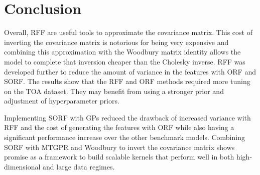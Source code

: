 \documentclass[11pt]{article}
\begin{document}
\section{Conclusion}
\label{sec:conclusion}

Overall, RFF are useful tools to approximate the covariance matrix. This cost of inverting the covariance matrix is notorious for being very expensive and combining this approximation with the Woodbury matrix identity allows the model to complete that inversion cheaper than the Cholesky inverse. RFF was developed further to reduce the amount of variance in the features with ORF and SORF. The results show that the RFF and ORF methods required more tuning on the TOA dataset. They may benefit from using a stronger prior and adjustment of hyperparameter priors. 

Implementing SORF with GPs reduced the drawback of increased variance with RFF and the cost of generating the features with ORF while also having a significant performance increase over the other benchmark models. Combining SORF with MTGPR and Woodbury to invert the covariance matrix shows promise as a framework to build scalable kernels that perform well in both high-dimensional and large data regimes.



\end{document}

